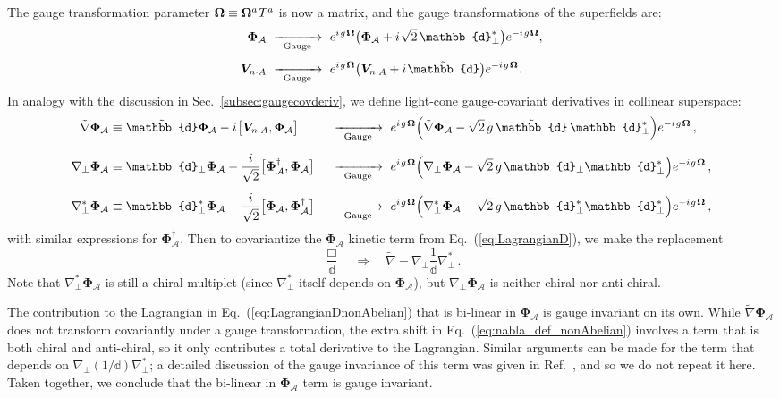 \documentclass[12pt,document,nofootinbib,superscriptaddress,onecolumn,preprintnumbers,balancelastpage]{article}
\newcommand{\s}{\hspace{0.8pt}}
\newcommand{\PP}{\mathbb{d}}
\newcommand{\gauge}{\,\,\xrightarrow[\hspace{5pt}\text{Gauge}\hspace{5pt}]{}\,\,}
\DeclareRobustCommand{\Sec}[1]{Sec.~\ref{#1}}
\DeclareRobustCommand{\Eq}[1]{Eq.~(\ref{#1})}
\DeclareRobustCommand{\Ref}[1]{Ref.~\cite{#1}}
\newcommand{\bPhiA}{ \boldsymbol{\Phi}_\alc}
\newcommand{\bD}{ \boldsymbol{V}_{n \cdot A}}
\newcommand{\bPhialc}{ \boldsymbol{\Phi}_\alc}
\newcommand{\RCA}{\boldsymbol{\Omega}}
\newcommand{\alc}{\mathcal{A}}
\begin{document}
\begin{spacing}{1.2}
The gauge transformation parameter $\RCA \equiv \RCA^a\s T^a$ is now a matrix, and the gauge transformations of the superfields are: 
%
\begin{align}
\bPhialc &\gauge e^{i\s g\s \RCA} \big(\bPhiA + i\s \sqrt{2}\, \PP_\perp^* \big) e^{-i\s g\s \RCA}, \notag\\[4pt]
\bD &\gauge e^{i\s g\s \RCA} \big(\bD + i\s \tilde{\PP} \big) e^{-i\s g\s \RCA}.
\end{align}
%
In analogy with the discussion in \Sec{subsec:gaugecovderiv}, we define light-cone gauge-covariant derivatives in collinear superspace: 
%
\begin{alignat}{2}
\tilde{\nabla}\bPhialc & \equiv \tilde{\PP} \bPhialc - i\s  \big[\bD, \bPhialc\big] &&\gauge e^{i\s g\s \RCA} \Big(\tilde{\nabla} \bPhiA - \sqrt{2} \, g \,  \tilde{\PP}\, \PP_\perp^* \Big) e^{-i\s g\s \RCA} \,, \notag\\[5pt]
\nabla_\perp \bPhialc &\equiv \PP_\perp \bPhialc - \frac{i}{\sqrt{2}} \big[\bPhiA^\dagger, \bPhialc\big] &&\gauge e^{i\s g\s \RCA} \Big(\nabla_\perp \bPhiA - \sqrt{2} \, g \,\PP_\perp \PP_\perp^*  \Big) e^{-i\s g\s \RCA} \,, \notag\\[5pt]
\nabla_\perp^* \bPhialc &\equiv  \PP_\perp^* \bPhialc - \frac{i}{\sqrt{2}}\big[\bPhiA , \bPhialc^\dagger \big]  &&\gauge e^{i\s g\s \RCA} \Big(\nabla_\perp^* \bPhiA -\sqrt{2} \,g \,\PP_\perp^* \PP_\perp^* \Big) e^{-i\s g\s \RCA} \,,
\label{eq:nabla_def_nonAbelian}
\end{alignat}
%
with similar expressions for $\bPhialc^\dagger$.
%
Then to covariantize the $\bPhialc$ kinetic term from \Eq{eq:LagrangianD}, we make the replacement 
%
\begin{equation}
\frac{\Box}{\PP} \quad \Rightarrow \quad \tilde{\nabla} - \nabla_\perp \frac{1}{\PP} \nabla_\perp^*\,.
\label{eq:BoxReplace}
\end{equation}
%
Note that $\nabla_\perp^* \bPhialc$ is still a chiral multiplet (since $\nabla_\perp^*$ itself depends on $\bPhialc$), but $\nabla_\perp \bPhialc$ is neither chiral nor anti-chiral. 



The contribution to the Lagrangian in \Eq{eq:LagrangianDnonAbelian} that is bi-linear in $\bPhialc$ is gauge invariant on its own.
%
While $\tilde{\nabla} \bPhialc$ does not transform covariantly under a gauge transformation, the extra shift in \Eq{eq:nabla_def_nonAbelian} involves a term that is both chiral and anti-chiral, so it only contributes a total derivative to the Lagrangian.
%
Similar arguments can be made for the term that depends on $\nabla_\perp(1/\PP) \nabla_\perp^*$; a detailed discussion of the gauge invariance of this term was given in \Ref{Cohen:2018qvn}, and so we do not repeat it here.
%
Taken together, we conclude that the bi-linear in $\bPhialc$ term is gauge invariant.




\end{spacing}
\end{document}
